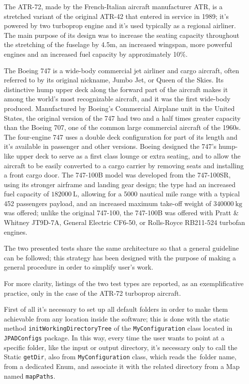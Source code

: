 \bigskip
\noindent
The ATR-72, made by the French-Italian aircraft manufacturer ATR, is a stretched variant of the original ATR-42 that entered in service in 1989; it’s powered by two turboprop engine and it’s used typically as a regional airliner. The main purpose of its design was to increase the seating capacity throughout the stretching of the fuselage by 4.5m, an increased wingspan, more powerful engines and an increased fuel capacity by approximately 10$\%$.

\bigskip
\noindent
The Boeing 747 is a wide-body commercial jet airliner and cargo aircraft, often referred to by its original nickname, Jumbo Jet, or Queen of the Skies. Its distinctive hump upper deck along the forward part of the aircraft makes it among the world's most recognizable aircraft, and it was the first wide-body produced. Manufactured by Boeing's Commercial Airplane unit in the United States, the original version of the 747 had two and a half times greater capacity than the Boeing 707, one of the common large commercial aircraft of the 1960s. The four-engine 747 uses a double deck configuration for part of its length and it’s available in passenger and other versions. Boeing designed the 747's hump-like upper deck to serve as a first class lounge or extra seating, and to allow the aircraft to be easily converted to a cargo carrier by removing seats and installing a front cargo door. The 747-100B model was developed from the 747-100SR, using its stronger airframe and landing gear design; the type had an increased fuel capacity of $\SI{182000}{\liter}$, allowing for a 5000 nautical mile range with a typical 452 passengers payload, and an increased maximum take-off weight of $\SI{340000}{\kilogram}$ was offered; unlike the original 747-100, the 747-100B was offered with Pratt \& Whitney JT9D-7A, General Electric CF6-50, or Rolls-Royce RB211-524 turbofan engines.

\bigskip
\noindent
The two presented tests share the same architecture so that a general guideline can be followed; this strategy has been designed with the purpose of making a general procedure in order to simplify user’s work.

\bigskip
\noindent
For more clarity, listings of the two test types are reported, as an exemplificative practice, only in the case of the ATR-72 turboprop aircraft. 

First of all it’s necessary to set up all default folders in order to make them achievable from any location inside the software; this is done with the static method \lstinline[language=Java]!initWorkingDirectoryTree! of the \lstinline[language=Java]!MyConfiguration! class located in \lstinline[language=Java]!JPADConfigs! package. In this way, every time the user wants to point at a specific folder, like the input or output directory, it’s necessary only to call the \gls{Static} \lstinline[language=Java]!getDir!, also from \lstinline[language=Java]!MyConfiguration! class, which reads the~folder name, from a dedicated \gls{Enum}, and associate it with the related directory from a \gls{Map} named \lstinline[language=Java]!mapPaths!.

